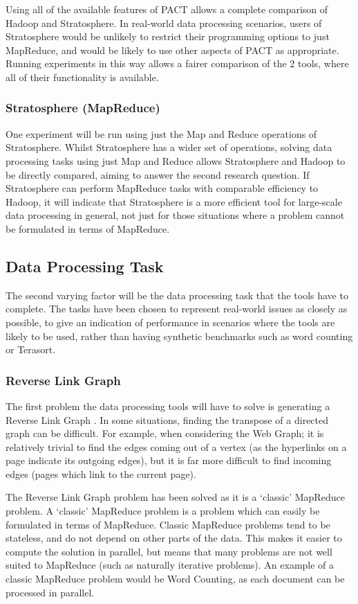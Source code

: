 Using all of the available features of PACT allows a complete comparison of Hadoop and Stratosphere. In real-world data processing scenarios, users of Stratosphere would be unlikely to restrict their programming options to just MapReduce, and would be likely to use other aspects of PACT as appropriate. Running experiments in this way allows a fairer comparison of the 2 tools, where all of their functionality is available.

\subsubsection{Stratosphere (MapReduce)}
One experiment will be run using just the Map and Reduce operations of Stratosphere. Whilst Stratosphere has a wider set of operations, solving data processing tasks using just Map and Reduce allows Stratosphere and Hadoop to be directly compared, aiming to answer the second research question. If Stratosphere can perform MapReduce tasks with comparable efficiency to Hadoop, it will indicate that Stratosphere is a more efficient tool for large-scale data processing in general, not just for those situations where a problem cannot be formulated in terms of MapReduce.

\subsection{Data Processing Task}
The second varying factor will be the data processing task that the tools have to complete. The tasks have been chosen to represent real-world issues as closely as possible, to give an indication of performance in scenarios where the tools are likely to be used, rather than having synthetic benchmarks such as word counting or Terasort. 

\subsubsection{Reverse Link Graph}
The first problem the data processing tools will have to solve is generating a Reverse Link Graph \cite{dean2008mapreduce}. In some situations, finding the transpose of a directed graph can be difficult. For example, when considering the Web Graph; it is relatively trivial to find the edges coming out of a vertex (as the hyperlinks on a page indicate its outgoing edges), but it is far more difficult to find incoming edges (pages which link to the current page). 

The Reverse Link Graph problem has been solved as it is a `classic' MapReduce problem. A `classic' MapReduce problem is a problem which can easily be formulated in terms of MapReduce. Classic MapReduce problems tend to be stateless, and do not depend on other parts of the data. This makes it easier to compute the solution in parallel, but means that many problems are not well suited to MapReduce (such as naturally iterative problems). An example of a classic MapReduce problem would be Word Counting, as each document can be processed in parallel. 

